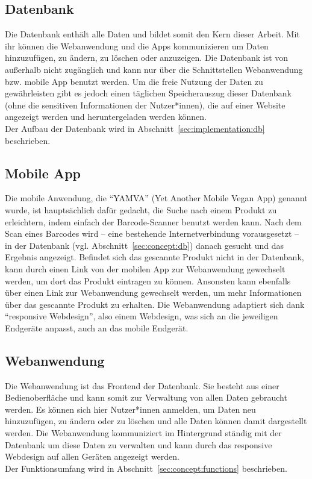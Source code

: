 \subsection*{Datenbank}
\label{sec:concept:db}

Die Datenbank enthält alle Daten und bildet somit den Kern dieser
Arbeit. Mit ihr können die Webanwendung und die Apps kommunizieren um
Daten hinzuzufügen, zu ändern, zu löschen oder anzuzeigen.
Die Datenbank ist von außerhalb nicht zugänglich und kann nur über die
Schnittstellen Webanwendung bzw. mobile App benutzt werden.
Um die freie Nutzung der Daten zu gewährleisten gibt es jedoch einen
täglichen Speicherauszug dieser Datenbank (ohne die sensitiven
Informationen der Nutzer*innen), die auf einer Website angezeigt
werden und heruntergeladen werden können.\\
Der Aufbau der Datenbank wird in Abschnitt~\ref{sec:implementation:db}
beschrieben.

\subsection*{Mobile App}
\label{sec:concept:app}

Die mobile Anwendung, die "`YAMVA"' (Yet Another Mobile Vegan App) genannt wurde,
ist hauptsächlich dafür gedacht, die Suche nach einem
Produkt zu erleichtern, indem einfach der Barcode-Scanner benutzt
werden kann. Nach dem Scan eines Barcodes wird -- eine bestehende
Internetverbindung vorausgesetzt -- in der Datenbank (vgl. Abschnitt~\ref{sec:concept:db})
danach gesucht und das
Ergebnis angezeigt.
Befindet sich das gescannte Produkt nicht in der Datenbank, kann durch
einen Link von der mobilen App zur Webanwendung
gewechselt werden, um dort das Produkt eintragen zu können. Ansonsten kann ebenfalls
über einen Link zur Webanwendung gewechselt werden, um mehr Informationen über das gescannte Produkt zu erhalten.
Die Webanwendung adaptiert sich dank
"`responsive Webdesign"', also einem Webdesign, was sich an die jeweiligen 
Endgeräte anpasst, auch an das mobile Endgerät.

\subsection*{Webanwendung}
\label{sec:concept:webapp}

Die Webanwendung ist das Frontend der Datenbank.
Sie besteht aus einer Bedienoberfläche und kann somit zur Verwaltung
von allen Daten gebraucht werden. Es können sich hier Nutzer*innen
anmelden, um Daten neu hinzuzufügen, zu ändern oder zu löschen und
alle Daten können damit dargestellt werden.
Die Webanwendung kommuniziert im Hintergrund ständig mit der Datenbank
um diese Daten zu verwalten
und kann durch das responsive Webdesign
auf allen Geräten angezeigt werden.\\
Der Funktionsumfang wird in Abschnitt~\ref{sec:concept:functions} beschrieben.

